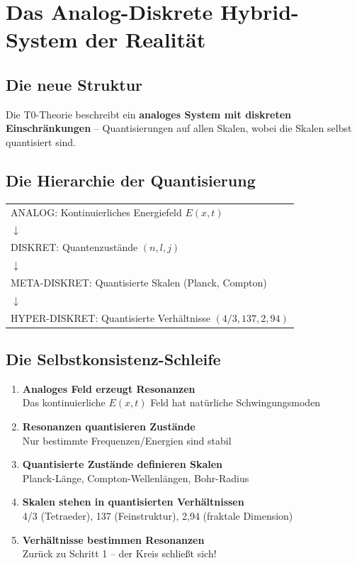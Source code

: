 	\section{Das Analog-Diskrete Hybrid-System der Realität}
	
	\subsection{Die neue Struktur}
	
	Die T0-Theorie beschreibt ein \textbf{analoges System mit diskreten Einschränkungen} -- Quantisierungen auf allen Skalen, wobei die Skalen selbst quantisiert sind.
	
	\subsection{Die Hierarchie der Quantisierung}
	
	\begin{center}
		\begin{tabular}{l}
			ANALOG: Kontinuierliches Energiefeld $E(x,t)$\\
			$\downarrow$\\
			DISKRET: Quantenzustände $(n, l, j)$\\
			$\downarrow$\\
			META-DISKRET: Quantisierte Skalen (Planck, Compton)\\
			$\downarrow$\\
			HYPER-DISKRET: Quantisierte Verhältnisse $(4/3, 137, 2{,}94)$
		\end{tabular}
	\end{center}
	
	\subsection{Die Selbstkonsistenz-Schleife}
	
	\begin{enumerate}
		\item \textbf{Analoges Feld erzeugt Resonanzen}\\
		Das kontinuierliche $E(x,t)$ Feld hat natürliche Schwingungsmoden
		
		\item \textbf{Resonanzen quantisieren Zustände}\\
		Nur bestimmte Frequenzen/Energien sind stabil
		
		\item \textbf{Quantisierte Zustände definieren Skalen}\\
		Planck-Länge, Compton-Wellenlängen, Bohr-Radius
		
		\item \textbf{Skalen stehen in quantisierten Verhältnissen}\\
		4/3 (Tetraeder), 137 (Feinstruktur), 2{,}94 (fraktale Dimension)
		
		\item \textbf{Verhältnisse bestimmen Resonanzen}\\
		Zurück zu Schritt 1 -- der Kreis schließt sich!
	\end{enumerate}
	
